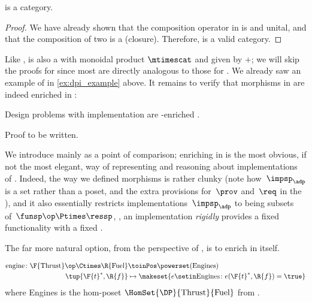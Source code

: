 \begin{lemma}
    \label{lem:DPI-is-category}
    \DPI is a category.
\end{lemma}

\begin{proof}
    We have already shown that the composition operator in \DPI is  and unital, and that the composition of two  is a  (closure).
    Therefore, \DPI is a valid category.
\end{proof}

Like \DP, \DPI is also a  with monoidal product $\mtimescat$ and  given by $+$;
we will skip the proofs for \DPI since most are directly analogous to those for \DP.
We already saw an example of \DPI in \cref{ex:dpi_example} above.
It remains to verify that morphisms in \DPI are indeed enriched in \Set:

\begin{proposition}
    Design problems with implementation are \Set-enriched .
\end{proposition}
\begin{publictodo}
    Proof to be written.
\end{publictodo}
We introduce \DPI mainly as a point of comparison; enriching in \Set is the most obvious, if not the most elegant, way of representing and reasoning about implementations of .
Indeed, the way we defined morphisms is rather clunky (note how~$\impsp_\adp$ is a set rather than a poset, and the extra provisions for~$\prov$ and~$\req$ in the ), and it also essentially restricts implementations~$\impsp_\adp$ to being subsets of~$\funsp\op \Ptimes \ressp$, \ie, an implementation \emph{rigidly} provides a fixed functionality \fun with a fixed \res.

The far more natural option, from the perspective of  , is to enrich  in \DP itself.

\begin{example}
    \begin{equation}
        \begin{aligned}
            \text{engine} \colon \F{\text{Thrust}}\op \Ctimes \R{\text{Fuel}} & \toinPos \powerset(\text{Engines}) \\
            \tup{\F{t}^*,\R{f}}                                               & \mapsto \makeset{ e \setin \text{Engines} \colon e(\F{t}^*, \R{f}) = \true }
        \end{aligned}
    \end{equation}
    where Engines is the hom-poset $\HomSet{\DP}{\text{Thrust}}{\text{Fuel}}$ from \XXX. %
\end{example}

